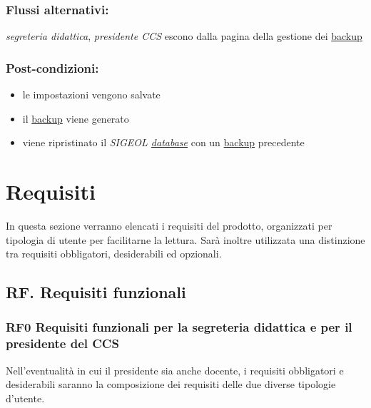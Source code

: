 \documentclass[11pt,a4paper]{article}
\begin{document}
\subsubsection*{Flussi alternativi:}
\textit{segreteria didattica}, \textit{presidente CCS} escono dalla pagina della gestione dei \underline{backup}
\subsubsection*{Post-condizioni:}
\begin{itemize}
\item le impostazioni vengono salvate
\item il \underline{backup} viene generato
\item viene ripristinato il \textit{SIGEOL \underline{database}} con un \underline{backup} precedente
\end{itemize}
\section{Requisiti} \label{requisiti}
In questa sezione verranno elencati i requisiti del prodotto, organizzati per tipologia di utente per facilitarne la lettura. Sarà inoltre utilizzata una distinzione tra requisiti obbligatori, desiderabili ed opzionali.
\subsection{RF. Requisiti funzionali}
\subsubsection{RF0 Requisiti funzionali per la segreteria didattica e per il presidente del CCS}
Nell'eventualità in cui il presidente sia anche docente, i requisiti obbligatori e desiderabili saranno la composizione dei requisiti delle due diverse tipologie d'utente.
\end{document}
